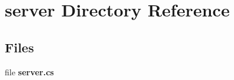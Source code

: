 \section{server Directory Reference}
\label{dir_41e1742e44e2de38b3bc91f993fed282}
\subsection*{Files}
\begin{DoxyCompactItemize}
\item 
file {\bf server.\-cs}
\end{DoxyCompactItemize}
